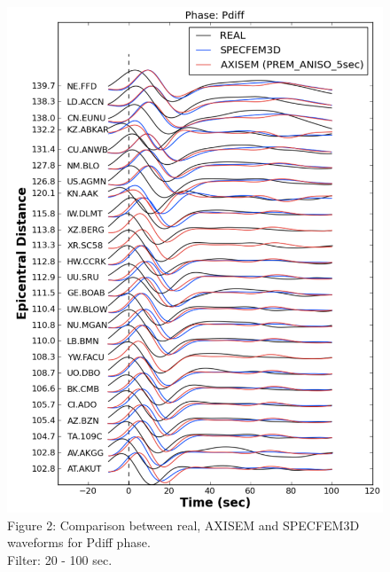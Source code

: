 \documentclass{article}
\begin{document}
\begin{figure}[H]
    \centering
    \begin{minipage}{.5\textwidth}
        \centering
        \includegraphics[width=0.9\linewidth]{AXISEMTutorial-fig010.pdf}
        {\small{}Figure 2: Comparison between real, AXISEM and SPECFEM3D waveforms for
        Pdiff phase. \\ Filter: 20 - 100 sec.}
    \end{minipage}%
    \begin{minipage}{.5\textwidth}
        \centering

\end{minipage}
\end{figure}
\end{document}
